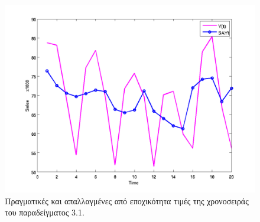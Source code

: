 \begin{figure} [ht]
  \centering
  \includegraphics[totalheight=3.2in,angle=0]{graff3.png}
  \caption{Πραγματικές και απαλλαγμένες από εποχικότητα τιμές της χρονοσειράς του παραδείγματος 3.1.}
\end{figure}

